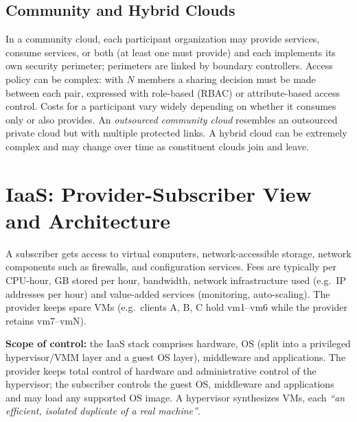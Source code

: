 \subsection{Community and Hybrid Clouds}
In a community cloud, each participant organization may provide services, consume services, or both
(at least one must provide) and each implements its own security perimeter; perimeters are linked by
boundary controllers. Access policy can be complex: with $N$ members a sharing decision must be made
between each pair, expressed with role-based (RBAC) or attribute-based access control. Costs for a
participant vary widely depending on whether it consumes only or also provides. An \emph{outsourced
community cloud} resembles an outsourced private cloud but with multiple protected links.
A hybrid cloud can be extremely complex and may change over time as constituent clouds join and leave.

\section{IaaS: Provider-Subscriber View and Architecture}
A subscriber gets access to virtual computers, network-accessible storage, network components such as
firewalls, and configuration services. Fees are typically per CPU-hour, GB stored per hour, bandwidth,
network infrastructure used (e.g.\ IP addresses per hour) and value-added services (monitoring,
auto-scaling). The provider keeps spare VMs (e.g.\ clients A, B, C hold vm1--vm6 while the provider
retains vm7--vmN).

\textbf{Scope of control:} the IaaS stack comprises hardware, OS (split into a privileged hypervisor/VMM layer and
a guest OS layer), middleware and applications. The provider keeps total control of hardware and
administrative control of the hypervisor; the subscriber controls the guest OS, middleware and
applications and may load any supported OS image. A hypervisor synthesizes VMs, each \emph{``an efficient,
isolated duplicate of a real machine''}.

